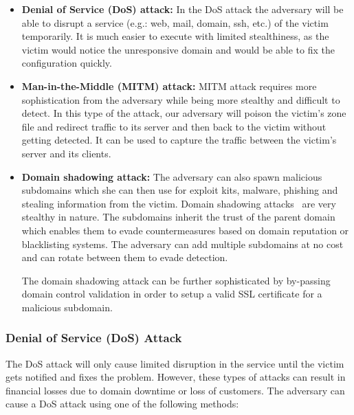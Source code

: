 \begin{itemize}
\item \textbf{Denial of Service (DoS) attack:} In the DoS attack the adversary will be able to disrupt a service (e.g.: web, mail, domain, ssh, etc.) of the victim temporarily. 
It is much easier to execute with limited stealthiness, as the victim would notice the unresponsive domain and would be able to fix the configuration quickly. 


\item \textbf{Man-in-the-Middle (MITM) attack:} MITM attack requires more sophistication from the adversary while being more stealthy and difficult to detect. In this type of the attack, our adversary will %
poison the victim's zone file and redirect traffic to its server and then back to the victim without getting detected. It can be used to capture the traffic between the victim's server and its clients. %

\item \textbf{Domain shadowing attack:} %
The adversary %
can also spawn malicious subdomains which she can then use for exploit kits, malware, phishing and stealing information from the victim. 
Domain shadowing attacks~\cite{shadowing} are %
very stealthy in nature. 
The subdomains inherit the trust of the parent domain which enables them to evade countermeasures based on domain reputation or blacklisting systems. 
The adversary can %
add multiple subdomains at no cost and can rotate between them to evade detection. 

The domain shadowing attack can be further sophisticated by by-passing domain control validation in order to setup a valid SSL certificate for a malicious subdomain.

\end{itemize}



\subsubsection{Denial of Service (DoS) Attack} 
The DoS attack will only cause limited disruption in the service until the victim gets notified and fixes the problem. However, these types of attacks can result in financial losses due to domain downtime or loss of customers. The adversary can cause a DoS attack using one of the following methods: %

